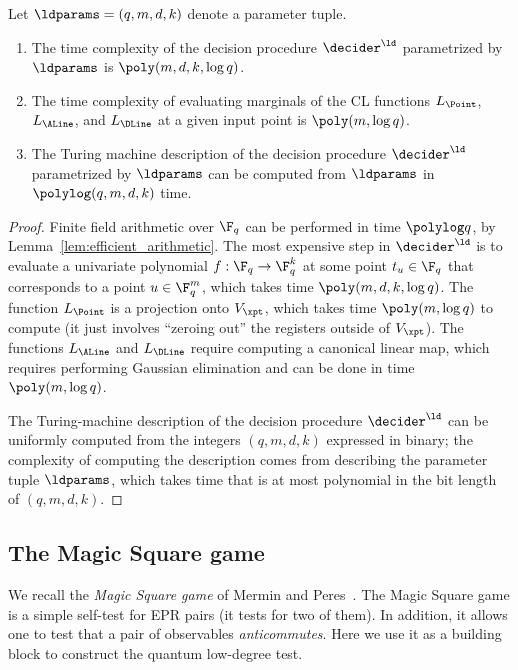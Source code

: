 \begin{lemma}
  \label{lem:ld-complexity}
  Let $\ldparams = (q,m,d,k)$ denote a parameter tuple.
  \begin{enumerate}
	\item The time complexity of the decision procedure $\decider^\ld$
    parametrized by $\ldparams$ is $\poly(m, d, k, \log q)$.
	\item The time complexity of evaluating marginals of the CL functions
    $L_\Point$, $L_\ALine$, and $L_\DLine$ at a given input point is $\poly(m, \log
    q)$.
	\item The Turing machine description of the decision procedure $\decider^\ld$
    parametrized by $\ldparams$ can be computed from $\ldparams$ in $\polylog
    (q,m,d,k)$ time.
  \end{enumerate}
\end{lemma}

\begin{proof}
	Finite field arithmetic over $\F_q$ can be performed in time $\polylog q$, by
  Lemma~\ref{lem:efficient_arithmetic}.
	The most expensive step in $\decider^\ld$ is to evaluate a univariate
  polynomial $f: \F_q \to \F_q^k$ at some point $t_u \in \F_q$ that corresponds
  to a point $u \in \F_q^m$, which takes time $\poly(m,d,k,\log q)$.
  The function $L_\Point$ is a projection onto $V_\xpt$, which takes time
  $\poly(m,\log q)$ to compute (it just involves ``zeroing out'' the registers
  outside of $V_\xpt$).
  The functions $L_\ALine$ and $L_\DLine$ require computing a canonical linear
  map, which requires performing Gaussian elimination and can be done in time
  $\poly(m,\log q)$.

  The Turing-machine description of the decision procedure $\decider^\ld$ can be
  uniformly computed from the integers $(q,m,d,k)$ expressed in binary; the
  complexity of computing the description comes from describing the parameter
  tuple $\ldparams$, which takes time that is at most polynomial in the bit
  length of $(q,m,d,k)$.
\end{proof}

\subsection{The Magic Square game}
\label{sec:ms}

We recall the \emph{Magic Square game} of Mermin and
Peres~\cite{mermin1990simple,peres1990incompatible,aravind2002simple}.
The Magic Square game is a simple self-test for EPR pairs (it tests for two of
them). In addition, it allows one to test that a pair of observables
\emph{anticommutes}.
Here we use it as a building block to construct the quantum low-degree test. 

